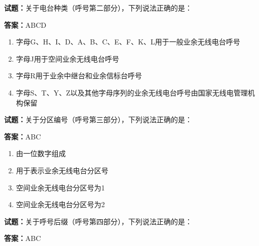 \documentclass{ctexbook}
\begin{document}




\vspace{1em}

\textbf{试题：}关于电台种类（呼号第二部分），下列说法正确的是： 

\textbf{答案：}ABCD 

\begin{enumerate}[leftmargin=3em]
  \item 字母G、H、I、D、A、B、C、E、F、K、L用于一般业余无线电台呼号 

  \item 字母J用于空间业余无线电台呼号 

  \item 字母R用于业余中继台和业余信标台呼号 


  \item 字母S、T、Y、Z以及其他字母序列的业余无线电台呼号由国家无线电管理机构保留 

\end{enumerate}





\vspace{1em}

\textbf{试题：}关于分区编号（呼号第三部分），下列说法正确的是： 

\textbf{答案：}ABC 

\begin{enumerate}[leftmargin=3em]
  \item 由一位数字组成 

  \item 用于表示业余无线电台分区号 

  \item 空间业余无线电台分区号为1 

  \item 空间业余无线电台分区号为2 

\end{enumerate}





\vspace{1em}

\textbf{试题：}关于呼号后缀（呼号第四部分），下列说法正确的是： 

\textbf{答案：}ABC 
\end{document}

